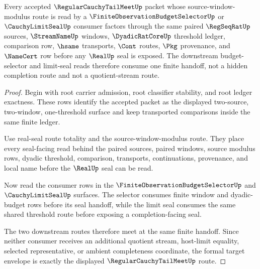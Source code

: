 \begin{theorem}
\label{thm:regular-cauchy-tail-meet-formal-target-envelope}
Every accepted $\RegularCauchyTailMeetUp$ packet whose source-window-modulus route is read by a $\FiniteObservationBudgetSelectorUp$ or $\CauchyLimitSealUp$ consumer factors through the same paired $\RegSeqRatUp$ sources, $\StreamNameUp$ windows, $\DyadicRatCoreUp$ threshold ledger, comparison row, $\hsame$ transports, $\Cont$ routes, $\Pkg$ provenance, and $\NameCert$ row before any $\RealUp$ seal is exposed. The downstream budget-selector and limit-seal reads therefore consume one finite handoff, not a hidden completion route and not a quotient-stream route.
\end{theorem}
\begin{proof}
Begin with root carrier admission, root classifier stability, and root ledger exactness. These rows identify the accepted packet as the displayed two-source, two-window, one-threshold surface and keep transported comparisons inside the same finite ledger.

Use real-seal route totality and the source-window-modulus route. They place every seal-facing read behind the paired sources, paired windows, source modulus rows, dyadic threshold, comparison, transports, continuations, provenance, and local name before the $\RealUp$ seal can be read.

Now read the consumer rows in the $\FiniteObservationBudgetSelectorUp$ and $\CauchyLimitSealUp$ surfaces. The selector consumes finite window and dyadic-budget rows before its seal handoff, while the limit seal consumes the same shared threshold route before exposing a completion-facing seal.

The two downstream routes therefore meet at the same finite handoff. Since neither consumer receives an additional quotient stream, host-limit equality, selected representative, or ambient completeness coordinate, the formal target envelope is exactly the displayed $\RegularCauchyTailMeetUp$ route.
\end{proof}

